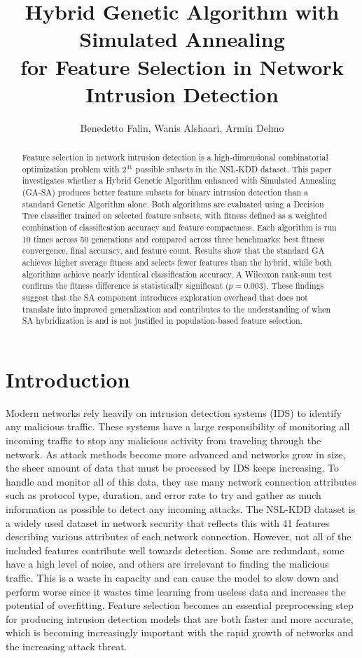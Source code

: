 \documentclass[letterpaper]{article} %
\title{Hybrid Genetic Algorithm with Simulated Annealing\\for Feature Selection in Network Intrusion Detection}
\author{
    Benedetto Falin,
    Wanis Alshaari,
    Armin Delmo
}
\begin{document}
\maketitle

\begin{abstract}
Feature selection in network intrusion detection is a high-dimensional combinatorial optimization problem with $2^{41}$ possible subsets in the NSL-KDD dataset. This paper investigates whether a Hybrid Genetic Algorithm enhanced with Simulated Annealing (GA-SA) produces better feature subsets for binary intrusion detection than a standard Genetic Algorithm alone. Both algorithms are evaluated using a Decision Tree classifier trained on selected feature subsets, with fitness defined as a weighted combination of classification accuracy and feature compactness. Each algorithm is run 10 times across 50 generations and compared across three benchmarks: best fitness convergence, final accuracy, and feature count. Results show that the standard GA achieves higher average fitness and selects fewer features than the hybrid, while both algorithms achieve nearly identical classification accuracy. A Wilcoxon rank-sum test confirms the fitness difference is statistically significant ($p = 0.003$). These findings suggest that the SA component introduces exploration overhead that does not translate into improved generalization and contributes to the understanding of when SA hybridization is and is not justified in population-based feature selection.
\end{abstract}

\section{Introduction}

Modern networks rely heavily on intrusion detection systems (IDS) to identify any malicious traffic. These systems have a large responsibility of monitoring all incoming traffic to stop any malicious activity from traveling through the network. As attack methods become more advanced and networks grow in size, the sheer amount of data that must be processed by IDS keeps increasing. To handle and monitor all of this data, they use many network connection attributes such as protocol type, duration, and error rate to try and gather as much information as possible to detect any incoming attacks. The NSL-KDD dataset is a widely used dataset in network security that reflects this with 41 features describing various attributes of each network connection. However, not all of the included features contribute well towards detection. Some are redundant, some have a high level of noise, and others are irrelevant to finding the malicious traffic. This is a waste in capacity and can cause the model to slow down and perform worse since it wastes time learning from useless data and increases the potential of overfitting. Feature selection becomes an essential preprocessing step for producing intrusion detection models that are both faster and more accurate, which is becoming increasingly important with the rapid growth of networks and the increasing attack threat.
\end{document}
